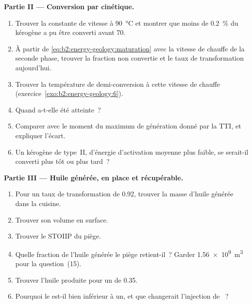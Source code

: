 \begin{problem}
\noindent\textbf{Partie II --- Conversion par cinétique.}
\begin{enumerate}[resume]
  \item Trouver la constante de vitesse à \qty{90}{\celsius} et montrer que moins de \qty{0.2}{\percent} du
        kérogène a pu être converti avant \qty{70}{\Ma}.
  \item À partir de \eqref{eq:b2:energy-geology:maturation} avec la vitesse de chauffe de la seconde phase,
        trouver la fraction non convertie et le taux de transformation aujourd'hui.
  \item Trouver la température de demi-conversion à cette vitesse de chauffe (exercice~\ref{exo:b2:energy-geology:6}).
  \item Quand a-t-elle été atteinte~?
  \item Comparer avec le moment du maximum de génération donné par la TTI, et expliquer l'écart.
  \item Un kérogène de type~II, d'énergie d'activation moyenne plus faible, se serait-il converti plus tôt ou plus tard~?
\end{enumerate}

\noindent\textbf{Partie III --- Huile générée, en place et récupérable.}
\begin{enumerate}[resume]
  \item Pour un taux de transformation de 0.92, trouver la masse d'huile générée dans la cuisine.
  \item Trouver son volume en surface.
  \item Trouver le STOIIP du piège.
  \item Quelle fraction de l'huile générée le piège retient-il~? Garder \qty{1.56e9}{m^3} pour la question~(15).
  \item Trouver l'huile produite pour un  de 0.35.
  \item Pourquoi le  est-il bien inférieur à un, et que changerait l'injection de ~?
\end{enumerate}


\end{problem}
